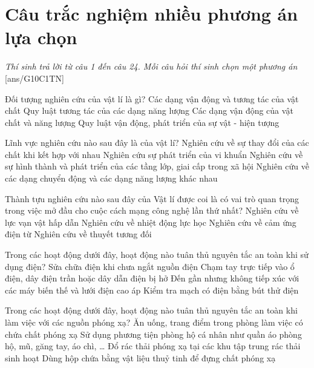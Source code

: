 		\section{Câu trắc nghiệm nhiều phương án lựa chọn}
		\textit{Thí sinh trả lời từ câu 1 đến câu 24. Mỗi câu hỏi thí sinh chọn một phương án}
		\setcounter{ex}{0}
		[ans/G10C1TN]
		\begin{ex}
			Đối tượng nghiên cứu của vật lí là gì?
			\choice
			{Các dạng vận động và tương tác của vật chất}
			{Quy luật tương tác của các dạng năng lượng}
			{\True Các dạng vận động của vật chất và năng lượng}
			{Quy luật vận động, phát triển của sự vật - hiện tượng}
			\loigiai{}
		\end{ex}
\begin{ex}
	Lĩnh vực nghiên cứu nào sau đây là của vật lí?	
	\choice
	{Nghiên cứu về sự thay đổi của các chất khi kết hợp với nhau}
	{Nghiên cứu sự phát triển của vi khuẩn}
	{Nghiên cứu về sự hình thành và phát triển của các tầng lớp, giai cấp trong xã hội}
	{\True Nghiên cứu về các dạng chuyển động và các dạng năng lượng khác nhau}
	\loigiai{}
\end{ex}
\begin{ex}
	Thành tựu nghiên cứu nào sau đây của Vật lí được coi là có vai trò quan trọng trong việc mở đầu cho cuộc cách mạng công nghệ lần thứ nhất?
	\choice
	{Nghiên cứu về lực vạn vật hấp dẫn}
	{\True Nghiên cứu về nhiệt động lực học}
	{Nghiên cứu về cảm ứng điện từ}
	{Nghiên cứu về thuyết tương đối}
	\loigiai{}
\end{ex}
\begin{ex}
	Trong các hoạt động dưới đây, hoạt động nào tuân thủ nguyên tắc an toàn khi sử dụng điện?
	\choice
	{Sửa chữa điện khi chưa ngắt nguồn điện}
	{Chạm tay trực tiếp vào ổ điện, dây điện trần hoặc dây dẫn điện bị hở}
	{Đến gần nhưng không tiếp xúc với các máy biến thế và lưới điện cao áp}
	{\True Kiểm tra mạch có điện bằng bút thử điện}
	\loigiai{}
\end{ex}
\begin{ex}
	Trong các hoạt động dưới đây, hoạt động nào tuân thủ nguyên tắc an toàn khi làm việc với các nguồn phóng xạ?
	\choice
	{Ăn uống, trang điểm trong phòng làm việc có chứa chất phóng xạ}
	{\True Sử dụng phương tiện phòng hộ cá nhân như quần áo phòng hộ, mũ, găng tay, áo chì, \dots}
	{Đổ rác thải phóng xạ tại các khu tập trung rác thải sinh hoạt}
	{Dùng hộp chứa bằng vật liệu thuỷ tinh để đựng chất phóng xạ}
	
	\loigiai{}
\end{ex}
